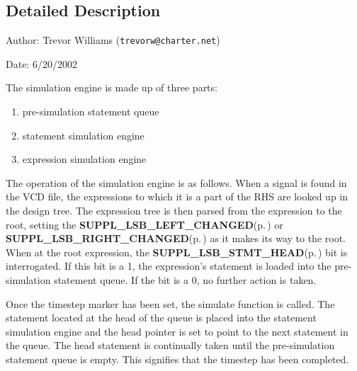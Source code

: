 \subsection{Detailed Description}
\begin{Desc}
\item[Author:]Trevor Williams ({\tt trevorw@charter.net}) \end{Desc}
\begin{Desc}
\item[Date:]6/20/2002\end{Desc}
\begin{Desc}
\item[]The simulation engine is made up of three parts:\begin{enumerate}
\item pre-simulation statement queue\item statement simulation engine\item expression simulation engine\end{enumerate}
\end{Desc}
\begin{Desc}
\item[]The operation of the simulation engine is as follows. When a signal is found in the VCD file, the expressions to which it is a part of the RHS are looked up in the design tree. The expression tree is then parsed from the expression to the root, setting the {\bf SUPPL\_\-LSB\_\-LEFT\_\-CHANGED}{\rm (p.\,\pageref{group__expr__suppl_a9})} or {\bf SUPPL\_\-LSB\_\-RIGHT\_\-CHANGED}{\rm (p.\,\pageref{group__expr__suppl_a10})} as it makes its way to the root. When at the root expression, the {\bf SUPPL\_\-LSB\_\-STMT\_\-HEAD}{\rm (p.\,\pageref{group__expr__suppl_a4})} bit is interrogated. If this bit is a 1, the expression's statement is loaded into the pre-simulation statement queue. If the bit is a 0, no further action is taken.\end{Desc}
\begin{Desc}
\item[]Once the timestep marker has been set, the simulate function is called. The statement located at the head of the queue is placed into the statement simulation engine and the head pointer is set to point to the next statement in the queue. The head statement is continually taken until the pre-simulation statement queue is empty. This signifies that the timestep has been completed.\end{Desc}
